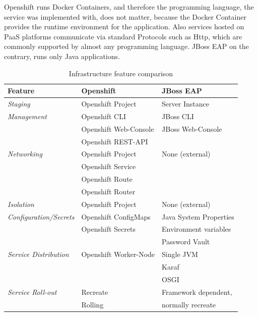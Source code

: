 Openshift runs Docker Containers, and therefore the programming language, the service was implemented with, does not matter, because the Docker Container provides the runtime environment for the application. Also services hosted on PaaS platforms communicate via standard Protocols such as Http, which are commonly supported by almost any programming language. JBoss EAP on the contrary, runs only Java applications.

{\renewcommand{\arraystretch}{1.2}%
\begin{table}[h]
	\begin{tabularx}{\textwidth}{ X|X|X }	
	  \textbf{Feature}              & \textbf{Openshift}      & \textbf{JBoss EAP} \\  \hline
	  \textit{Staging}                  & Openshift Project       & Server Instance \\  \hline
	  \textit{Management}               & Openshift CLI           & JBoss CLI \\
	                                    & Openshift Web-Console   & JBoss Web-Console \\
	                                    & Openshift REST-API      & \\  \hline
	  \textit{Networking}               & Openshift Project       & None (external) \\
	                                    & Openshift Service       & \\  
	                                    & Openshift Route         & \\  
	                                    & Openshift Router        & \\  \hline
	  \textit{Isolation}                & Openshift Project       & None (external) \\  \hline
	  \textit{Configuration/Secrets}    & Openshift ConfigMaps    & Java System Properties  \\
	                                    & Openshift Secrets       & Environment variables \\
	                                                             && Password Vault \\  \hline
	  \textit{Service Distribution}     & Openshift Worker-Node   & Single JVM \\ 
			                                                     && Karaf \\  
			                                                     && OSGI \\  \hline
	  \textit{Service Roll-out}         & Recreate                & Framework dependent, \\ 
			                            & Rolling                 & normally recreate \\
	\end{tabularx}
	\caption{Infrastructure feature comparison}
	\label{tab:esbd-multi-stage-env}
\end{table}}

